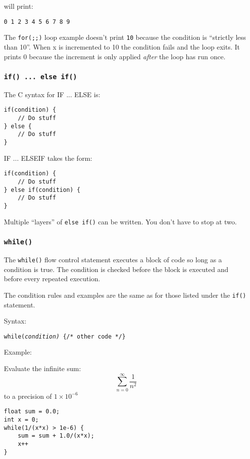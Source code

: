 \documentclass{lab}
\begin{document}
\begin{multicols}{2}
will print:

\texttt{0 1 2 3 4 5 6 7 8 9}

The \texttt{for(;;)} loop example doesn't print \texttt{10} because the condition is ``strictly less than 10''. When x is incremented to 10 the condition fails and the loop exits. It prints 0 because the increment is only applied \textit{after} the loop has run once.

\subsubsection{\texttt{if() ... else if()}}

The C syntax for IF ... ELSE is:

\begin{lstlisting}[style=CStyle]
if(condition) {
	// Do stuff
} else {
	// Do stuff
}
\end{lstlisting}

IF ... ELSEIF takes the form:

\begin{lstlisting}[style=CStyle]
if(condition) {
	// Do stuff
} else if(condition) {
	// Do stuff
}
\end{lstlisting}

Multiple ``layers'' of \texttt{else if()} can be written. You don't have to stop at two.

\subsubsection{\texttt{while()}}

The \texttt{while()} flow control statement executes a block of code so long as a condition is true. The condition is checked before the block is executed and before every repeated execution.

The condition rules and examples are the same as for those listed under the \texttt{if()} statement.

Syntax:

\texttt{while(\textit{condition)} \{/* other code */\}}

Example:

Evaluate the infinite sum:
\begin{equation}
\sum_{n=0}^{\infty} \frac{1}{n^2}
\end{equation}
to a precision of $1 \times 10^{-6}$
\begin{lstlisting}[style=CStyle]
float sum = 0.0;
int x = 0;
while(1/(x*x) > 1e-6) {
	sum = sum + 1.0/(x*x);
	x++
}
\end{lstlisting}


\end{multicols}
\end{document}
